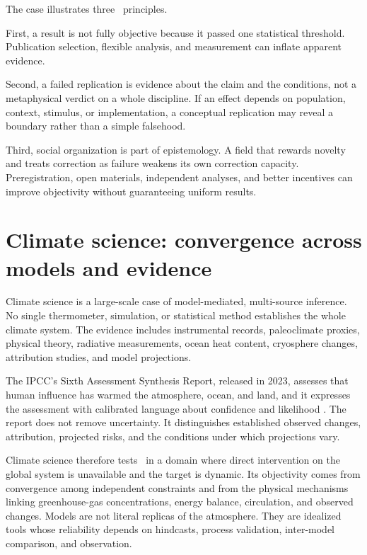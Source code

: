 The case illustrates three \RCR\ principles.

First, a result is not fully objective because it passed one statistical
threshold. Publication selection, flexible analysis, and measurement can
inflate apparent evidence.

Second, a failed replication is evidence about the claim and the conditions,
not a metaphysical verdict on a whole discipline. If an effect depends on
population, context, stimulus, or implementation, a conceptual replication
may reveal a boundary rather than a simple falsehood.

Third, social organization is part of epistemology. A field that rewards
novelty and treats correction as failure weakens its own correction capacity.
Preregistration, open materials, independent analyses, and better incentives
can improve objectivity without guaranteeing uniform results.

\section{Climate science: convergence across models and evidence}

Climate science is a large-scale case of model-mediated, multi-source
inference. No single thermometer, simulation, or statistical method establishes
the whole climate system. The evidence includes instrumental records,
paleoclimate proxies, physical theory, radiative measurements, ocean heat
content, cryosphere changes, attribution studies, and model projections.

The IPCC's Sixth Assessment Synthesis Report, released in 2023, assesses that
human influence has warmed the atmosphere, ocean, and land, and it expresses
the assessment with calibrated language about confidence and likelihood
\citep{ipcc2023}. The report does not remove uncertainty. It distinguishes
established observed changes, attribution, projected risks, and the conditions
under which projections vary.

Climate science therefore tests \RCR\ in a domain where direct intervention on
the global system is unavailable and the target is dynamic. Its objectivity
comes from convergence among independent constraints and from the physical
mechanisms linking greenhouse-gas concentrations, energy balance, circulation,
and observed changes. Models are not literal replicas of the atmosphere. They
are idealized tools whose reliability depends on hindcasts, process validation,
inter-model comparison, and observation.

